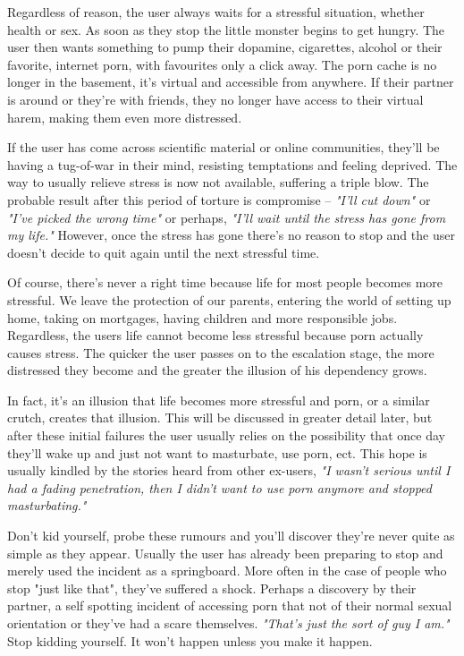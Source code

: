 \documentclass[easypeasy.tex]{subfiles}
\begin{document}
Regardless of reason, the user always waits for a stressful situation, whether health or sex. As soon as they stop the little monster begins to get hungry. The user then wants something to pump their dopamine, cigarettes, alcohol or their favorite, internet porn, with favourites only a click away. The porn cache is no longer in the basement, it's virtual and accessible from anywhere. If their partner is around or they're with friends, they no longer have access to their virtual harem, making them even more distressed.

If the user has come across scientific material or online communities, they'll be having a tug-of-war in their mind, resisting temptations and feeling deprived. The way to usually relieve stress is now not available, suffering a triple blow. The probable result after this period of torture is compromise -- \textit{"I'll cut down"} or \textit{"I've picked the wrong time"} or perhaps, \textit{"I'll wait until the stress has gone from my life."} However, once the stress has gone there's no reason to stop and the user doesn't decide to quit again until the next stressful time.

Of course, there's never a right time because life for most people becomes more stressful. We leave the protection of our parents, entering the world of setting up home, taking on mortgages, having children and more responsible jobs. Regardless, the users life cannot become less stressful because porn actually causes stress. The quicker the user passes on to the escalation stage, the more distressed they become and the greater the illusion of his dependency grows.

In fact, it's an illusion that life becomes more stressful and porn, or a similar crutch, creates that illusion. This will be discussed in greater detail later, but after these initial failures the user usually relies on the possibility that once day they'll wake up and just not want to masturbate, use porn, ect. This hope is usually kindled by the stories heard from other ex-users, \textit{"I wasn't serious until I had a fading penetration, then I didn't want to use porn anymore and stopped masturbating."}

Don't kid yourself, probe these rumours and you'll discover they're never quite as simple as they appear. Usually the user has already been preparing to stop and merely used the incident as a springboard. More often in the case of people who stop "just like that", they've suffered a shock. Perhaps a discovery by their partner, a self spotting incident of accessing porn that not of their normal sexual orientation or they've had a scare themselves. \textit{"That's just the sort of guy I am."} Stop kidding yourself. It won't happen unless you make it happen.
\end{document}
